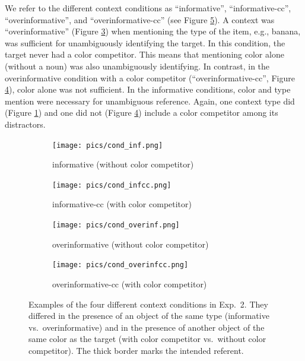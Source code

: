 \documentclass[11pt]{article}
\newcommand{\figref}[1]{Figure \ref{#1}}
\begin{document}
We refer to the different context conditions  as ``informative'', ``informative-cc'', ``overinformative'', and ``overinformative-cc'' (see \figref{fig:conditions}). A context was ``overinformative'' (\figref{fig:condOverinf}) when mentioning the type of the item, e.g., banana, was sufficient for unambiguously identifying the target.  In this condition, the target never had a color competitor. This means that mentioning color alone (without a noun) was also unambiguously identifying. In contrast, in the overinformative condition with a color competitor (``overinformative-cc'', \figref{fig:condOverinfcc}), color alone was not sufficient. In the informative conditions, color and type mention were necessary for unambiguous reference. Again, one context type did (\figref{fig:condInf}) and one did not (\figref{fig:condOverinfcc}) include a color competitor among its distractors.

\begin{figure}[bt!]
	\begin{subfigure}{.5\textwidth}
		\centering
		\texttt{[image: pics/cond\_inf.png]}
		\caption{informative (without color competitor)}
		\label{fig:condInf}
	\end{subfigure}
	\begin{subfigure}{.5\textwidth}
		\centering
		\texttt{[image: pics/cond\_infcc.png]}
		\centering
		\caption{informative-cc (with color competitor)}
		\label{fig:condInfcc}
	\end{subfigure}
	\begin{subfigure}{.5\textwidth}
		\centering
		\texttt{[image: pics/cond\_overinf.png]}
		\caption{overinformative (without color competitor)}
		\label{fig:condOverinf}
	\end{subfigure}
	\begin{subfigure}{.5\textwidth}
		\centering
		\texttt{[image: pics/cond\_overinfcc.png]}
		\centering
		\caption{overinformative-cc (with color competitor)}
		\label{fig:condOverinfcc}
	\end{subfigure}
	\caption{Examples of the four different context conditions in Exp.~2. They differed in the presence of an object of the same type (informative vs.~overinformative) and in the presence of another object of the same color as the target (with color competitor vs.~without color competitor). The thick border marks the intended referent.}
	\label{fig:conditions}
\end{figure}
\end{document}
